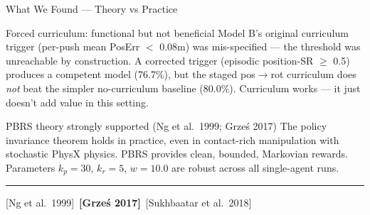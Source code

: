 \documentclass[aspectratio=169,xcolor=dvipsnames,t]{beamer}
\newcommand{\litfooter}[1]{%
  \vspace{2pt}%
  \hrule%
  \vspace{2pt}%
  {\tiny\color{LightDarkGrey} #1}%
}
\begin{document}
\begin{frame}[t]{What We Found — Theory vs Practice}
  \begin{exampleblock}{Forced curriculum: functional but not beneficial}
    Model B's original curriculum trigger (per-push mean PosErr $<$ 0.08m) was mis-specified — the threshold was unreachable by construction. A corrected trigger (episodic position-SR $\ge$ 0.5) produces a competent model (76.7\%), but the staged pos$\to$rot curriculum does \emph{not} beat the simpler no-curriculum baseline (80.0\%). Curriculum works — it just doesn't add value in this setting.
  \end{exampleblock}

  \vspace{1pt}
  \begin{exampleblock}{PBRS theory strongly supported (Ng et al.\ 1999; Grze\'s 2017)}
    The policy invariance theorem holds in practice, even in contact-rich manipulation with stochastic PhysX physics. PBRS provides clean, bounded, Markovian rewards. Parameters $k_p{=}30$, $k_r{=}5$, $w{=}10.0$ are robust across all single-agent runs.
  \end{exampleblock}

  \vfill\litfooter{[Ng et al.\ 1999]~\textbf{[Grze\'s 2017]}~[Sukhbaatar et al.\ 2018]}
\end{frame}

\end{document}
